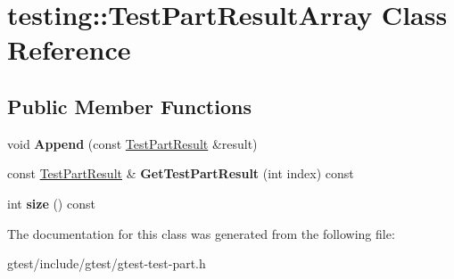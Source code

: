 \hypertarget{classtesting_1_1TestPartResultArray}{}\section{testing\+:\+:Test\+Part\+Result\+Array Class Reference}
\label{classtesting_1_1TestPartResultArray}
\subsection*{Public Member Functions}
\begin{DoxyCompactItemize}
\item 
\mbox{\label{classtesting_1_1TestPartResultArray_a01844bd505b18a666324617a1b459558}} 
void {\bfseries Append} (const \hyperlink{classtesting_1_1TestPartResult}{Test\+Part\+Result} \&result)
\item 
\mbox{\label{classtesting_1_1TestPartResultArray_ad5f97a52a36f120fa08fa9638901740e}} 
const \hyperlink{classtesting_1_1TestPartResult}{Test\+Part\+Result} \& {\bfseries Get\+Test\+Part\+Result} (int index) const
\item 
\mbox{\label{classtesting_1_1TestPartResultArray_a31555f11ba42b81ddad0a26a87710d0a}} 
int {\bfseries size} () const
\end{DoxyCompactItemize}


The documentation for this class was generated from the following file\+:\begin{DoxyCompactItemize}
\item 
gtest/include/gtest/gtest-\/test-\/part.\+h\end{DoxyCompactItemize}
